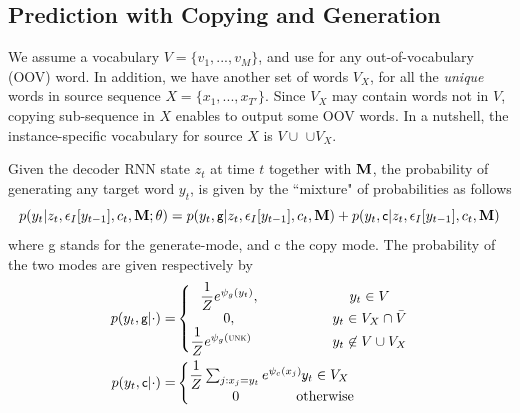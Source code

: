 \subsection{Prediction with Copying and Generation}
\label{cp3.sec.predict}
We assume a vocabulary $V=\{v_1, ..., v_M\}$, and use \unk for any out-of-vocabulary (OOV) word. 
In addition, we have another set of words $V_X$, for all the 
\emph{unique} words in source sequence $X=\{x_1, ..., x_{T'}\}$.
Since $V_X$ may contain words not in $V$, copying sub-sequence in $X$ enables 
\copynet to output some OOV words. 
In a nutshell, the instance-specific vocabulary for source $X$ is $V \cup$ \unk $\cup V_X$.

Given the decoder RNN state $z_t$ at time $t$ together with $\mathbf{M}$,      
the probability of generating any target word $y_t$,  is given by the ``mixture" of probabilities as follows
\begin{equation}
p(y_t|z_t, \epsilon_I[y_{t-1}], c_t, \mathbf{M}; \theta) = 
p(y_t, \textsf{\small g} | z_t, \epsilon_I[y_{t-1}], c_t, \mathbf{M}) + 
p(y_t, \textsf{\small c}| z_t, \epsilon_I[y_{t-1}], c_t, \mathbf{M}) \label{cp3.eq.mix}
\end{equation}
where \textsf{\small g} stands for the generate-mode, and \textsf{\small c} the copy mode. The probability of the two modes 
are given respectively by
\begin{eqnarray} %
\label{cp3.eq.pg}
p(y_t, \textsf{\small g}|\cdot) 
=&
 \left \{\begin{matrix}
\dfrac{1}{Z}e^{\psi_g(y_t)},                       \;\;\; \qquad& \;\;\; y_t \in V \\
0,                                                                          \;\;\; \qquad&\;\;\; y_t \in V_X \cap \bar{V}\\
\dfrac{1}{Z}e^{\psi_g(\textsc{unk})} \;\;\;\;     \;\;\; \qquad& \;\;\; y_t \not \in V \cup V_X     \\
\end{matrix}\right. \\
\label{cp3.eq.pc}
	p(y_t, \textsf{\small c}|\cdot)
	=& 
	\left \{\begin{matrix}
\dfrac{1}{Z}\sum_{j:x_j=y_t} e^{\psi_c(x_j)},  \hspace{-17pt} &y_t \in V_X \\
0 &\text{otherwise} 
\end{matrix}\right. 
\end{eqnarray}

